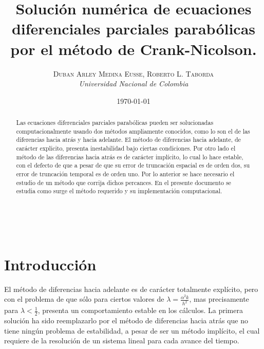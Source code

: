 \documentclass[11pt]{article} %
\title{\textbf{Solución numérica de ecuaciones diferenciales parciales parabólicas por el método de Crank-Nicolson.}\\ %
}
\author{\textsc{Duban Arley Medina Eusse, Roberto L. Taborda} %
\\{\textit{Universidad Nacional de Colombia}}} %
\date{\today} %
\makeatletter
\renewcommand{\maketitle}{ %
\begin{flushright} %
{\LARGE\@title} %

\vspace{50pt} %

{\large\@author} %
\\\@date %

\vspace{40pt} %
\end{flushright}
}
\makeatother
\begin{document}
\maketitle %


\renewcommand{\abstractname}{Resumen} %

\begin{abstract}
Las ecuaciones diferenciales parciales parabólicas pueden ser solucionadas computacionalmente usando dos métodos ampliamente conocidos, como lo son el de las diferencias hacia atrás y hacia adelante. El método de diferencias hacia adelante, de carácter explicito, presenta inestabilidad bajo ciertas condiciones. Por otro lado el método de las diferencias hacia atrás es de carácter implícito, lo cual lo hace estable, con el defecto de que a pesar de que su error de truncación espacial es de orden dos, su error de truncación temporal es de orden uno. Por lo anterior se hace necesario el estudio de un método que corrija dichos percances. En el presente documento se estudia como surge el método requerido y su implementación computacional.
\end{abstract}


\vspace{30pt} %


\section*{Introducción}

El método de diferencias hacia adelante es de carácter totalmente explícito, pero con el problema de que sólo para ciertos valores de $\lambda =\frac{\alpha ^2 k}{h^2}$, mas precisamente para $\lambda < \frac{1}{2}$, presenta un comportamiento estable en los cálculos. La primera solución ha sido reemplazarlo por el método de diferencias hacia atrás que no tiene ningún problema de estabilidad, a pesar de ser un método implícito, el cual requiere de la resolución de un sistema lineal para cada avance del tiempo.
\end{document}
